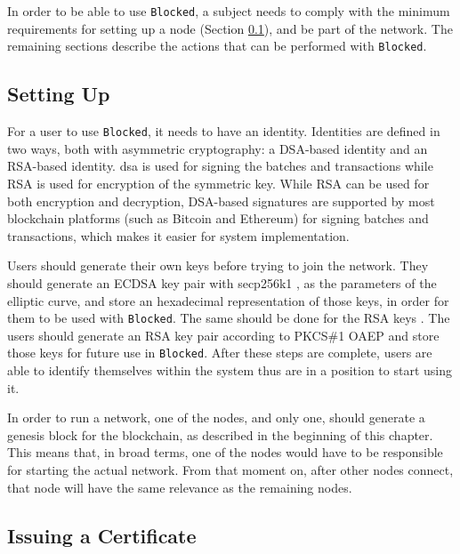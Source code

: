 In order to be able to use \texttt{Blocked}, a subject needs to comply with the minimum requirements for setting up a node (Section \ref{sec:design-setup}), and be part of the network. The remaining sections describe the actions that can be performed with \texttt{Blocked}.

\subsection{Setting Up}
\label{sec:design-setup}

For a user to use \texttt{Blocked}, it needs to have an identity. Identities are defined in two ways, both with asymmetric cryptography: a DSA-based identity and an RSA-based identity. \gls{dsa} \cite{cameron_f._kerry_digital_2013} is used for signing the batches and transactions while RSA \cite{rivest_method_1978} is used for encryption of the symmetric key. While RSA \cite{rivest_method_1978} can be used for both encryption and decryption, DSA-based signatures are supported by most blockchain platforms (such as Bitcoin and Ethereum) for signing batches and transactions, which makes it easier for system implementation.

Users should generate their own keys before trying to join the network. They should generate an ECDSA \cite{johnson_elliptic_2001} key pair with secp256k1 \cite{secp256k1}, as the parameters of the elliptic curve, and store an hexadecimal representation of those keys, in order for them to be used with \texttt{Blocked}. The same should be done for the RSA keys \cite{rivest_method_1978}. The users should generate an RSA \cite{rivest_method_1978} key pair according to PKCS\#1 OAEP \cite{moriarty_pkcs_2016} and store those keys for future use in \texttt{Blocked}. After these steps are complete, users are able to identify themselves within the system thus are in a position to start using it.

In order to run a network, one of the nodes, and only one, should generate a genesis block for the blockchain, as described in the beginning of this chapter. This means that, in broad terms, one of the nodes would have to be responsible for starting the actual network. From that moment on, after other nodes connect, that node will have the same relevance as the remaining nodes.

\subsection{Issuing a Certificate}

